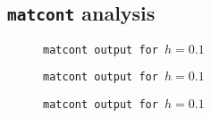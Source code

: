 \newpage
\subsection{\texttt{matcont} analysis}
\begin{figure}


\caption{\texttt{matcont output for $h=0.1$}}
%
%
\end{figure}

\begin{figure}

%
\caption{\texttt{matcont output for $h=0.1$}}
\end{figure}

\begin{figure}

\caption{\texttt{matcont output for $h=0.1$}}
\end{figure}


